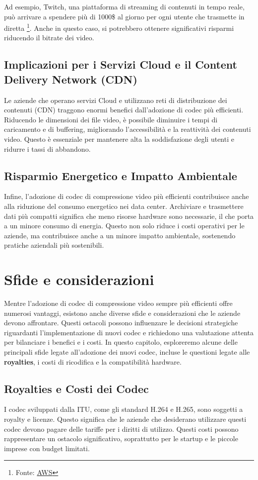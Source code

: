 \documentclass[a4paper,12pt, oneside]{article}
\begin{document}
Ad esempio, Twitch, una piattaforma di streaming di contenuti in tempo reale, può arrivare a spendere più di
1000\$ al giorno per ogni utente che trasmette in diretta \footnote{Fonte: \href{https://ivs.rocks/calculator}{AWS}}.
Anche in questo caso, si potrebbero ottenere significativi risparmi riducendo il bitrate dei video.

\subsection{Implicazioni per i Servizi Cloud e il Content Delivery Network (CDN)}
Le aziende che operano servizi Cloud e utilizzano reti di distribuzione dei contenuti (CDN) traggono
enormi benefici dall'adozione di codec più efficienti. Riducendo le dimensioni dei file video, è
possibile diminuire i tempi di caricamento e di buffering, migliorando l'accessibilità e la reattività
dei contenuti video. Questo è essenziale per mantenere alta la soddisfazione degli utenti e ridurre i
tassi di abbandono.

\subsection{Risparmio Energetico e Impatto Ambientale}
Infine, l'adozione di codec di compressione video più efficienti contribuisce anche alla riduzione del
consumo energetico nei data center. Archiviare e trasmettere dati più compatti significa che meno
risorse hardware sono necessarie, il che porta a un minore consumo di energia. Questo non solo riduce
i costi operativi per le aziende, ma contribuisce anche a un minore impatto ambientale, sostenendo
pratiche aziendali più sostenibili.

\section{Sfide e considerazioni}
Mentre l'adozione di codec di compressione video sempre più efficienti offre numerosi vantaggi,
esistono anche diverse sfide e considerazioni che le aziende devono affrontare. Questi ostacoli
possono influenzare le decisioni strategiche riguardanti l'implementazione di nuovi codec e
richiedono una valutazione attenta per bilanciare i benefici e i costi. In questo capitolo,
esploreremo alcune delle principali sfide legate all'adozione dei nuovi codec, incluse le
questioni legate alle \textbf{royalties}, i costi di ricodifica e la compatibilità hardware.

\subsection{Royalties e Costi dei Codec}
I codec sviluppati dalla ITU, come gli standard H.264 e H.265, sono soggetti a royalty e
licenze. Questo significa che le aziende che desiderano utilizzare questi codec devono pagare
delle tariffe per i diritti di utilizzo. Questi costi possono rappresentare un ostacolo
significativo, soprattutto per le startup e le piccole imprese con budget limitati.
\end{document}
